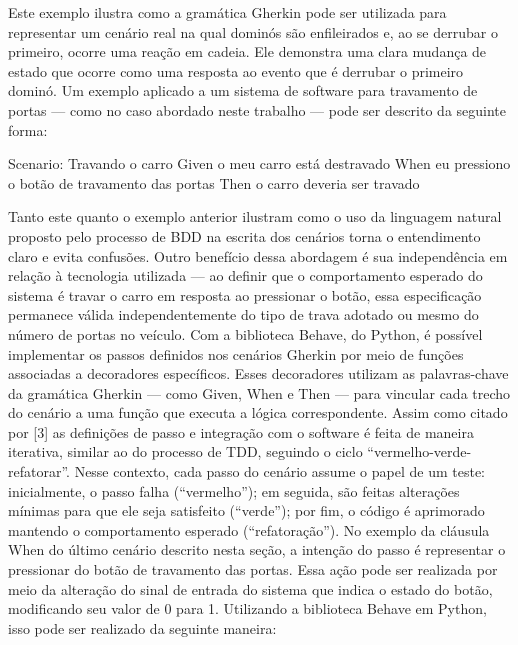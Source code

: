 Este exemplo ilustra como a gramática Gherkin pode ser utilizada para representar um cenário real na qual dominós são enfileirados e, ao se derrubar o primeiro, ocorre uma reação em cadeia. Ele demonstra uma clara mudança de estado que ocorre como uma resposta ao evento que é derrubar o primeiro dominó.
Um exemplo aplicado a um sistema de software para travamento de portas — como no caso abordado neste trabalho — pode ser descrito da seguinte forma:

Scenario: Travando o carro
Given o meu carro está destravado
When eu pressiono o botão de travamento das portas
Then o carro deveria ser travado

Tanto este quanto o exemplo anterior ilustram como o uso da linguagem natural proposto pelo processo de BDD na escrita dos cenários torna o entendimento claro e evita confusões. Outro benefício dessa abordagem é sua independência em relação à tecnologia utilizada — ao definir que o comportamento esperado do sistema é travar o carro em resposta ao pressionar o botão, essa especificação permanece válida independentemente do tipo de trava adotado ou mesmo do número de portas no veículo.
Com a biblioteca Behave, do Python, é possível implementar os passos definidos nos cenários Gherkin por meio de funções associadas a decoradores específicos. Esses decoradores utilizam as palavras-chave da gramática Gherkin — como Given, When e Then — para vincular cada trecho do cenário a uma função que executa a lógica correspondente.
Assim como citado por [3] as definições de passo e integração com o software é feita de maneira iterativa, similar ao do processo de TDD, seguindo o ciclo “vermelho-verde-refatorar”. Nesse contexto, cada passo do cenário assume o papel de um teste: inicialmente, o passo falha (“vermelho”); em seguida, são feitas alterações mínimas para que ele seja satisfeito (“verde”); por fim, o código é aprimorado mantendo o comportamento esperado (“refatoração”).
No exemplo da cláusula When do último cenário descrito nesta seção, a intenção do passo é representar o pressionar do botão de travamento das portas. Essa ação pode ser realizada por meio da alteração do sinal de entrada do sistema que indica o estado do botão, modificando seu valor de 0 para 1. Utilizando a biblioteca Behave em Python, isso pode ser realizado da seguinte maneira:


